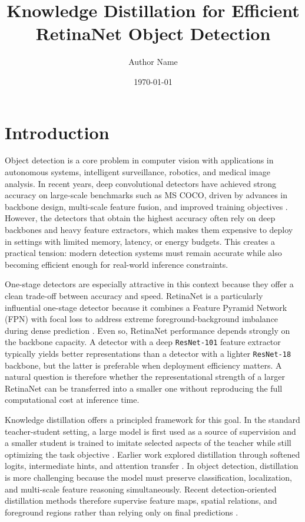 \documentclass[12pt]{article}
\title{Knowledge Distillation for Efficient RetinaNet Object Detection}
\author{Author Name}
\date{\today}
\begin{document}
\maketitle

\section{Introduction}
Object detection is a core problem in computer vision with applications in autonomous systems, intelligent surveillance, robotics, and medical image analysis. In recent years, deep convolutional detectors have achieved strong accuracy on large-scale benchmarks such as MS COCO, driven by advances in backbone design, multi-scale feature fusion, and improved training objectives \cite{lin2014coco,he2016resnet,lin2017fpn,lin2017focal}. However, the detectors that obtain the highest accuracy often rely on deep backbones and heavy feature extractors, which makes them expensive to deploy in settings with limited memory, latency, or energy budgets. This creates a practical tension: modern detection systems must remain accurate while also becoming efficient enough for real-world inference constraints.

One-stage detectors are especially attractive in this context because they offer a clean trade-off between accuracy and speed. RetinaNet is a particularly influential one-stage detector because it combines a Feature Pyramid Network (FPN) with focal loss to address extreme foreground-background imbalance during dense prediction \cite{lin2017fpn,lin2017focal}. Even so, RetinaNet performance depends strongly on the backbone capacity. A detector with a deep \texttt{ResNet-101} feature extractor typically yields better representations than a detector with a lighter \texttt{ResNet-18} backbone, but the latter is preferable when deployment efficiency matters. A natural question is therefore whether the representational strength of a larger RetinaNet can be transferred into a smaller one without reproducing the full computational cost at inference time.

Knowledge distillation offers a principled framework for this goal. In the standard teacher-student setting, a large model is first used as a source of supervision and a smaller student is trained to imitate selected aspects of the teacher while still optimizing the task objective \cite{hinton2015distilling}. Earlier work explored distillation through softened logits, intermediate hints, and attention transfer \cite{romero2015fitnets,zagoruyko2017paying}. In object detection, distillation is more challenging because the model must preserve classification, localization, and multi-scale feature reasoning simultaneously. Recent detection-oriented distillation methods therefore supervise feature maps, spatial relations, and foreground regions rather than relying only on final predictions \cite{wang2019distilling,yang2022focal}.
\end{document}
